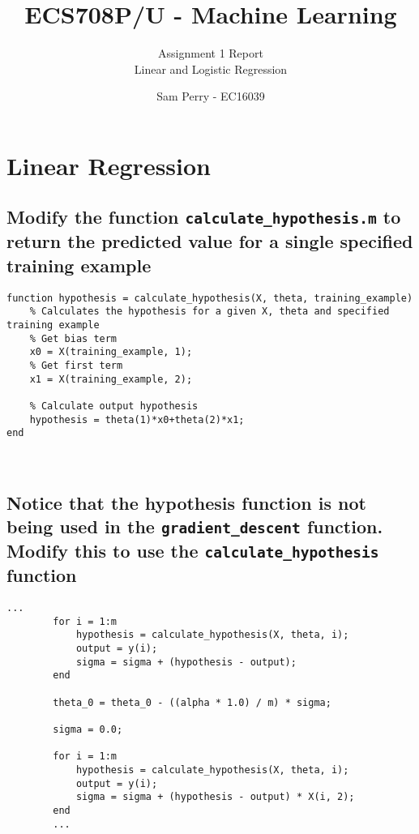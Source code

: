 \documentclass[titlepage]{scrartcl}
\newcommand{\code}[1]{\texttt{#1}}
\begin{document}
\title{ECS708P/U - Machine Learning}
\subtitle{\LARGE{Assignment 1 Report\\Linear and Logistic Regression}}
\author{Sam Perry - EC16039}

\maketitle

\section{Linear Regression}
\subsection{Modify the function \code{calculate\_hypothesis.m} to return the predicted value for a single specified training example}
\begin{lstlisting}
function hypothesis = calculate_hypothesis(X, theta, training_example)
    % Calculates the hypothesis for a given X, theta and specified training example
    % Get bias term
    x0 = X(training_example, 1);
    % Get first term
    x1 = X(training_example, 2);

    % Calculate output hypothesis
    hypothesis = theta(1)*x0+theta(2)*x1;
end
\end{lstlisting}\leavevmode \\

\subsection{Notice that the hypothesis function is not being used in the
\code{gradient\_descent} function. Modify this to use the
\code{calculate\_hypothesis} function}
\begin{lstlisting}[firstnumber=27]
        ...
        for i = 1:m
            hypothesis = calculate_hypothesis(X, theta, i);
            output = y(i);
            sigma = sigma + (hypothesis - output);
        end

        theta_0 = theta_0 - ((alpha * 1.0) / m) * sigma;

        sigma = 0.0;

        for i = 1:m
            hypothesis = calculate_hypothesis(X, theta, i);
            output = y(i);
            sigma = sigma + (hypothesis - output) * X(i, 2);
        end
        ...
\end{lstlisting}\leavevmode \\
 
\end{document}
